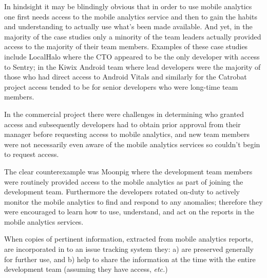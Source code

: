 In hindsight it may be blindingly obvious that in order to use mobile analytics one first needs access to the mobile analytics service and then to gain the habits and understanding to actually use what's been made available. And yet, in the majority of the case studies only a minority of the team leaders actually provided access to the majority of their team members. Examples of these case studies include LocalHalo where the CTO appeared to be the only developer with access to Sentry; in the Kiwix Android team where lead developers were the majority of those who had direct access to Android Vitals and similarly for the Catrobat project access tended to be for senior developers who were long-time team members.

In the commercial project there were challenges in determining who granted access and subsequently developers had to obtain prior approval from their manager before requesting access to mobile analytics, and new team members were not necessarily even aware of the mobile analytics services so couldn't begin to request access. 

The clear counterexample was Moonpig where the development team members were routinely provided access to the mobile analytics as part of joining the development team. Furthermore the developers rotated on-duty to actively monitor the mobile analytics to find and respond to any anomalies; therefore they were encouraged to learn how to use, understand, and act on the reports in the mobile analytics services.

When copies of pertinent information, extracted from mobile analytics reports, are incorporated in to an issue tracking system they: a) are preserved generally for further use, and b) help to share the information at the time with the entire development team (assuming they have access, \emph{etc.}) 

